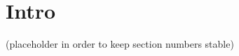 \documentclass[pldi,preprint]{sigplanconf}
\begin{document}


\section{Intro}
(placeholder in order to keep section numbers stable)


 












\end{document}
